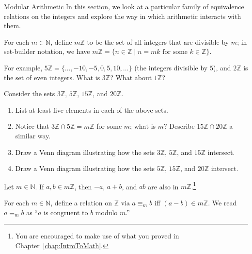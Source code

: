 \begin{section}{Modular Arithmetic}\label{sec:ModularArithmetic}
In this section, we look at a particular family of equivalence relations on the integers and explore the way in which arithmetic interacts with them.

\begin{definition}
For each $m\in \mathbb{N}$, define $m\mathbb{Z}$ to be the set of all integers that are divisible by $m$; in set-builder notation, we have   $m\mathbb{Z} = \{n \in \mathbb{Z}  \mid n = mk \text{ for some } k \in \mathbb{Z}\}.$

\end{definition}

For example, $5 \mathbb{Z} = \{ \ldots,-10,-5,0,5,10,\ldots\}$ (the integers divisible by $5$), and $2\mathbb{Z}$ is the set of even integers. What is $3\mathbb{Z}$? What about $1\mathbb{Z}$?

\begin{exercise} 
Consider the sets $3 \mathbb{Z}$, $5 \mathbb{Z}$, $15 \mathbb{Z}$, and $20 \mathbb{Z}$.
\begin{enumerate}[label=\textrm{(\alph*)}]
\item List at least five elements in each of the above sets.
\item Notice that $3 \mathbb{Z} \cap5 \mathbb{Z} = m\mathbb{Z}$ for some $m$; what is $m$? Describe $15 \mathbb{Z}\cap 20 \mathbb{Z}$ a similar way.
\item Draw a Venn diagram illustrating how the sets $3 \mathbb{Z}$, $5 \mathbb{Z}$, and $15 \mathbb{Z}$ intersect.  
\item Draw a Venn diagram illustrating how the sets $5 \mathbb{Z}$, $15 \mathbb{Z}$, and $20 \mathbb{Z}$ intersect.
\end{enumerate}
\end{exercise}

\begin{theorem}
Let $m\in \mathbb{N}$. If $a,b \in m \mathbb{Z}$, then $-a$, $a+b$, and $ab$ are also in $m \mathbb{Z}$.\footnote{You are encouraged to make use of what you proved in Chapter~\ref{chap:IntroToMath}.}
\end{theorem}

\begin{definition}\label{def:modulo}
For each  $m\in \mathbb{N}$,  define a relation on $\mathbb{Z}$ via $a\equiv_m b$ iff $(a-b) \in m\mathbb{Z}$. We read $a\equiv_m b$ as ``$a$ is congruent to $b$ modulo $m$.''
\end{definition}


\end{section}
